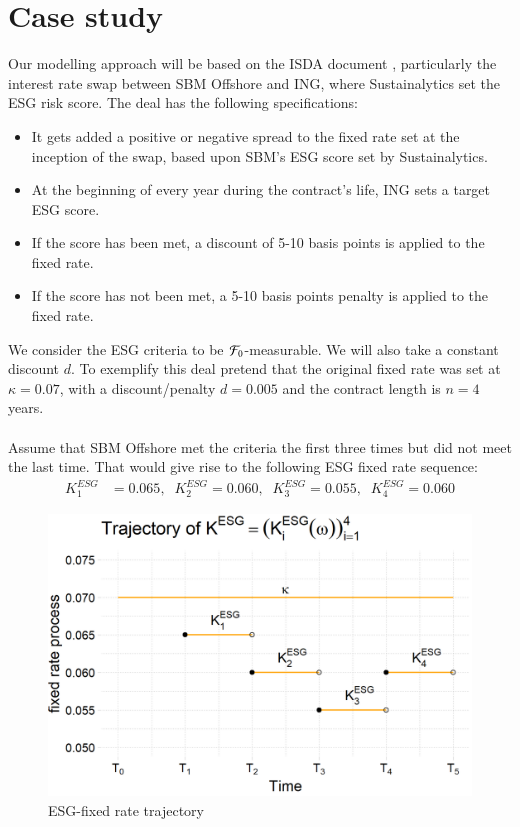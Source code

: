 \section{Case study}
Our modelling approach will be based on the ISDA document \cite{ISDA:2021}, particularly the interest rate swap between SBM Offshore and ING, where Sustainalytics set the ESG risk score. The deal has the following specifications:
\begin{itemize}
    \item It gets added a positive or negative spread to the fixed rate set at the inception of the swap, based upon SBM's ESG score set by Sustainalytics. 
    \item At the beginning of every year during the contract's life, ING sets a target ESG score.
    \item If the score has been met, a discount of 5-10 basis points is applied to the fixed rate.
    \item If the score has not been met, a 5-10 basis points penalty is applied to the fixed rate. 
\end{itemize} 

We consider the ESG criteria to be $\mathcal{F}_{0}$-measurable. We will also take a constant discount $d$. To exemplify this deal pretend that the original fixed rate was set at $\kappa = 0.07$, with a discount/penalty $d = 0.005$ and the contract length is $n=4$ years. 
\\~\\
Assume that SBM Offshore met the criteria the first three times but did not meet the last time. That would give rise to the following ESG fixed rate sequence: 
\begin{align*}
K_{1}^{ESG} &=  0.065, \;\; 
K_{2}^{ESG} =   0.060, \;\;
K_{3}^{ESG} =   0.055, \;\; 
K_{4}^{ESG} =   0.060
\end{align*}


\begin{figure}[htp]
    \centering
    \includegraphics[width=12cm]{figures/ESG/SBM_ESG_path.png}
    \caption{ESG-fixed rate trajectory}
    \label{fig: SBM_ESG_path}
\end{figure}


